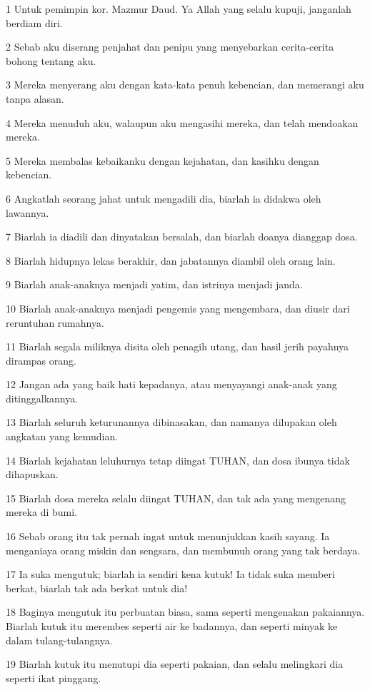 \par 1 Untuk pemimpin kor. Mazmur Daud. Ya Allah yang selalu kupuji, janganlah berdiam diri.
\par 2 Sebab aku diserang penjahat dan penipu yang menyebarkan cerita-cerita bohong tentang aku.
\par 3 Mereka menyerang aku dengan kata-kata penuh kebencian, dan memerangi aku tanpa alasan.
\par 4 Mereka menuduh aku, walaupun aku mengasihi mereka, dan telah mendoakan mereka.
\par 5 Mereka membalas kebaikanku dengan kejahatan, dan kasihku dengan kebencian.
\par 6 Angkatlah seorang jahat untuk mengadili dia, biarlah ia didakwa oleh lawannya.
\par 7 Biarlah ia diadili dan dinyatakan bersalah, dan biarlah doanya dianggap dosa.
\par 8 Biarlah hidupnya lekas berakhir, dan jabatannya diambil oleh orang lain.
\par 9 Biarlah anak-anaknya menjadi yatim, dan istrinya menjadi janda.
\par 10 Biarlah anak-anaknya menjadi pengemis yang mengembara, dan diusir dari reruntuhan rumahnya.
\par 11 Biarlah segala miliknya disita oleh penagih utang, dan hasil jerih payahnya dirampas orang.
\par 12 Jangan ada yang baik hati kepadanya, atau menyayangi anak-anak yang ditinggalkannya.
\par 13 Biarlah seluruh keturunannya dibinasakan, dan namanya dilupakan oleh angkatan yang kemudian.
\par 14 Biarlah kejahatan leluhurnya tetap diingat TUHAN, dan dosa ibunya tidak dihapuskan.
\par 15 Biarlah dosa mereka selalu diingat TUHAN, dan tak ada yang mengenang mereka di bumi.
\par 16 Sebab orang itu tak pernah ingat untuk menunjukkan kasih sayang. Ia menganiaya orang miskin dan sengsara, dan membunuh orang yang tak berdaya.
\par 17 Ia suka mengutuk; biarlah ia sendiri kena kutuk! Ia tidak suka memberi berkat, biarlah tak ada berkat untuk dia!
\par 18 Baginya mengutuk itu perbuatan biasa, sama seperti mengenakan pakaiannya. Biarlah kutuk itu merembes seperti air ke badannya, dan seperti minyak ke dalam tulang-tulangnya.
\par 19 Biarlah kutuk itu menutupi dia seperti pakaian, dan selalu melingkari dia seperti ikat pinggang.

